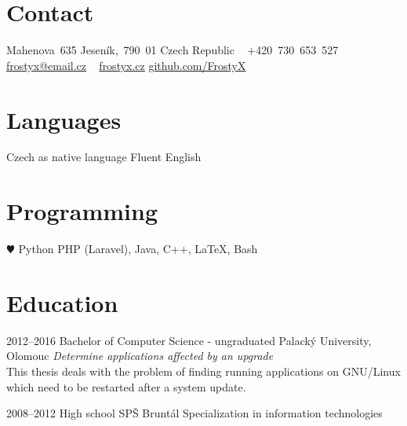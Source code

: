 \documentclass[]{friggeri-cv}
\begin{document}



\begin{aside} %
\section{Contact}
Mahenova~635
Jeseník,~790~01
Czech Republic
~
+420~730~653~527
\href{mailto:frostyx@email.cz}{frostyx@email.cz}
~
\href{http://frostyx.cz}{frostyx.cz}
\href{https://github.com/FrostyX}{github.com/FrostyX}
\section{Languages}
Czech as native language
Fluent English
\section{Programming}
{\color{red} $\varheartsuit$} Python
PHP (Laravel), Java,
C++, LaTeX, Bash
\end{aside}



\section{Education}

\begin{entrylist}

\entry
{2012--2016}
{Bachelor {\normalfont of Computer Science - ungraduated}}
{Palacký University, Olomouc}
{\emph{Determine applications affected by an upgrade} \\ This thesis deals with the problem of finding running applications on GNU/Linux which need to be restarted after a system update.}

\entry
{2008--2012}
{{\normalfont High school}}
{SPŠ Bruntál}
{Specialization in information technologies}

\end{entrylist}


\end{document}
